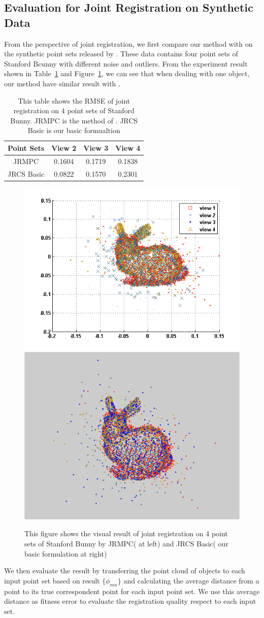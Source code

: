 \subsection{Evaluation for Joint Registration on Synthetic Data}
From the perspective of joint registration, we first compare our method with \cite{Evangelidis2014} on the synthetic point sets released by \cite{Evangelidis2014}. These data contains four point sets of Stanford Bcunny with different noise and outliers. From the experiment result shown in Table~\ref{tab:reg} and Figure~\ref{fig:reg}, we can see that when dealing with one object, our method have similar result with \cite{Evangelidis2014}.
\begin{table}
	\centering
	\caption{This table shows the RMSE of joint registration on 4 point sets of Stanford Bunny. JRMPC is the method of \cite{Evangelidis2014}. JRCS Basic is our basic formualtion}
	\begin{tabular}{c c c c}
		Point Sets& View 2 & View 3 & View 4 \\
		\hline
		JRMPC & 0.1604 & 0.1719 & 0.1838\\   
		JRCS Basic & 0.0822 &  0.1570  & 0.2301\\
	\end{tabular}
	\label{tab:reg}
\end{table}
\begin{figure}[htb]
	\centering
	\includegraphics[width=0.4\linewidth]{images/JRMPC.png}
	\includegraphics[width=0.4\linewidth]{images/JRCSReg.png}
	\caption{This figure shows the visual result of joint registration on 4 point sets of Stanford Bunny by JRMPC(\cite{Evangelidis2014} at left) and JRCS Basic( our basic formulation at right) }
	\label{fig:reg}
\end{figure}
We then evaluate the result by transferring the point cloud of objects to each input point set based on result $\{\phi_{mn}\}$ and calculating the average distance from a point to its true correspondent point for each input point set.
We use this average distance as fitness error to evaluate the registration quality respect to each input set.


